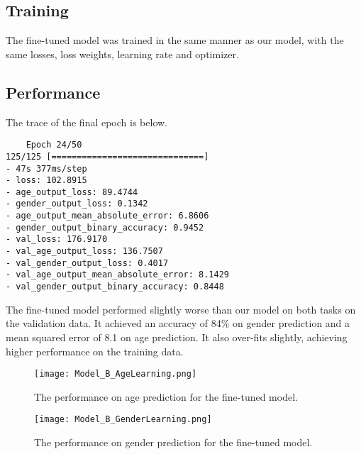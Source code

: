 \subsection{Training}
The fine-tuned model was trained in the same manner as our model, with the same losses, loss weights,
learning rate and optimizer. 


\subsection{Performance}
The trace of the final epoch is below.
\begin{verbatim}
    Epoch 24/50
125/125 [==============================] 
- 47s 377ms/step 
- loss: 102.8915 
- age_output_loss: 89.4744 
- gender_output_loss: 0.1342 
- age_output_mean_absolute_error: 6.8606 
- gender_output_binary_accuracy: 0.9452 
- val_loss: 176.9170 
- val_age_output_loss: 136.7507 
- val_gender_output_loss: 0.4017 
- val_age_output_mean_absolute_error: 8.1429 
- val_gender_output_binary_accuracy: 0.8448
\end{verbatim}

The fine-tuned model performed slightly worse than our model on both tasks on the validation data.
It achieved an accuracy of 84\% on gender prediction and a mean squared error of 8.1 on age
prediction. It also over-fits slightly, achieving higher performance on the training data.

\begin{figure}
    \centering
    \texttt{[image: Model\_B\_AgeLearning.png]}
    \caption{\label{fig:ModelBPerformanceAge} The performance on age prediction for the fine-tuned model.}
\end{figure}


\begin{figure}
    \centering
    \texttt{[image: Model\_B\_GenderLearning.png]}
    \caption{\label{fig:ModelBPerformanceGender} The performance on gender prediction for the fine-tuned model.}
\end{figure}
